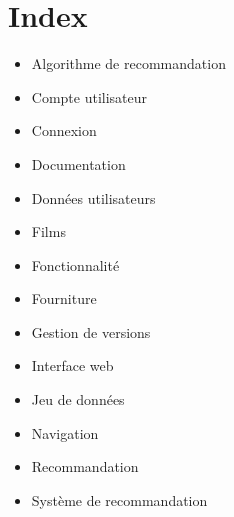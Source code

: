 \documentclass[a4paper,12pt]{report}
\begin{document}
\chapter*{Index}
\begin{itemize}
    \item Algorithme de recommandation \pageref{ADR1}
    \item Compte utilisateur \pageref{CU1} 
    \item Connexion \pageref{Co1} \pageref{Co2} \pageref{Co3}
    \item Documentation \pageref{Doc1}
    \item Données utilisateurs \pageref{DU1} \pageref{DU2}
    \item Films \pageref{Fi1} \pageref{Fi2} \pageref{Fi3} \pageref{Fi4}
    \item Fonctionnalité \pageref{Fonc1}
    \item Fourniture \pageref{Four1}
    \item Gestion de versions \pageref{GV1}
    \item Interface web \pageref{IW1} \pageref{IW2}
    \item Jeu de données \pageref{JD1}
    \item Navigation \pageref{Nav1}
    \item Recommandation \pageref{Rec1} \pageref{Rec2} \pageref{Rec3}
    \item Système de recommandation \pageref{SR1}
\end{itemize}
\end{document}
